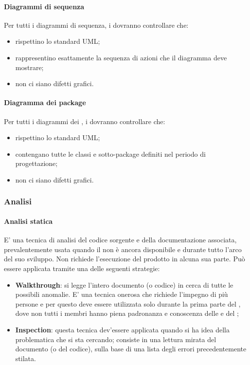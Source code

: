 \paragraph{Diagrammi di sequenza}
Per tutti i diagrammi di sequenza, i \VERP{} dovranno controllare che:
\begin{itemize}
	\item rispettino lo standard UML;
	\item rappresentino esattamente la sequenza di azioni che il diagramma deve mostrare;
	\item non ci siano difetti grafici.
\end{itemize}
\paragraph{Diagramma dei package}
Per tutti i diagrammi dei , i \VERP{} dovranno controllare che:
\begin{itemize}
	\item rispettino lo standard UML;
	\item contengano tutte le classi e sotto-package definiti nel periodo di progettazione;
	\item non ci siano difetti grafici.
\end{itemize}
\subsubsection{Analisi}
\paragraph{Analisi statica}
E' una tecnica di analisi del codice sorgente e della documentazione associata, prevalentemente
usata quando il  non è ancora disponibile e durante tutto l'arco del suo sviluppo. Non
richiede l'esecuzione del prodotto  in alcuna sua parte. Può essere applicata tramite una
delle seguenti strategie:
\begin{itemize}
	\item \textbf{Walkthrough}: si legge l'intero documento (o codice) in cerca di tutte le possibili anomalie. E' una tecnica onerosa che richiede l'impegno di più persone e per questo deve essere utilizzata solo durante la prima parte del , dove non tutti i membri hanno piena padronanza e conoscenza delle \NPdoc e del \PQdoc;
	\item \textbf{Inspection}: questa tecnica dev'essere applicata quando si ha idea della
	problematica che si sta cercando; consiste in una lettura mirata del
	documento (o del codice), sulla base di una lista degli errori precedentemente
	stilata.
\end{itemize}
